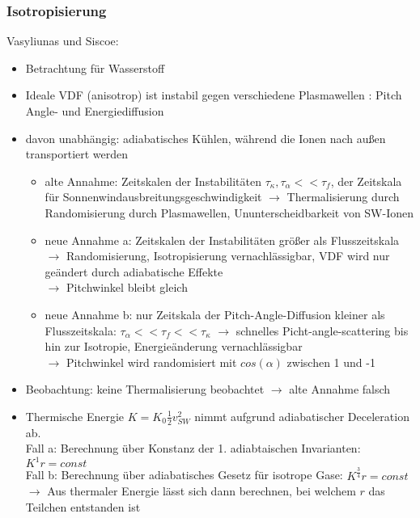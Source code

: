 \documentclass[]{article}
\begin{document}
\subsubsection{Isotropisierung}
%
Vasyliunas und Siscoe:
\begin{itemize}
	\item Betrachtung für Wasserstoff 
	\item Ideale VDF (anisotrop) ist instabil gegen verschiedene Plasmawellen : Pitch Angle- und Energiediffusion
	\item davon unabhängig: adiabatisches Kühlen, während die Ionen nach außen transportiert  werden
	\begin{itemize}
		\item alte Annahme: Zeitskalen der Instabilitäten $\tau_{\kappa}, \tau_{\alpha} << \tau_f$, der Zeitskala für Sonnenwindausbreitungsgeschwindigkeit  $\rightarrow$ Thermalisierung durch Randomisierung durch Plasmawellen, Ununterscheidbarkeit von SW-Ionen
		\item neue Annahme a: Zeitskalen der Instabilitäten größer als Flusszeitskala $\rightarrow$ Randomisierung, Isotropisierung vernachlässigbar, VDF wird nur geändert durch adiabatische Effekte \\
		$\rightarrow$ Pitchwinkel bleibt gleich
		\item neue Annahme b: nur Zeitskala der Pitch-Angle-Diffusion kleiner als Flusszeitskala: $\tau_{\alpha} << \tau_f << \tau_{\kappa}$ $\rightarrow$ schnelles Picht-angle-scattering bis hin zur Isotropie, Energieänderung vernachlässigbar \\
		$\rightarrow$ Pitchwinkel wird randomisiert mit $cos(\alpha)$ zwischen 1 und -1
	\end{itemize}
	\item Beobachtung: keine Thermalisierung beobachtet $\rightarrow$ alte Annahme	falsch
	\item Thermische Energie $K = K_0 \frac{1}{2} v_{SW}^2$ nimmt aufgrund adiabatischer Deceleration ab. \\
	Fall a: Berechnung über Konstanz der 1. adiabtaischen Invarianten: $K^1 r= const$\\
	Fall b: Berechnung über adiabatisches Gesetz für isotrope Gase: $K^{\frac{3}{4}} r= const$ \\
	$\rightarrow$ Aus thermaler Energie lässt sich dann berechnen, bei welchem $r$ das Teilchen entstanden ist
\end{itemize}
%
\end{document}
